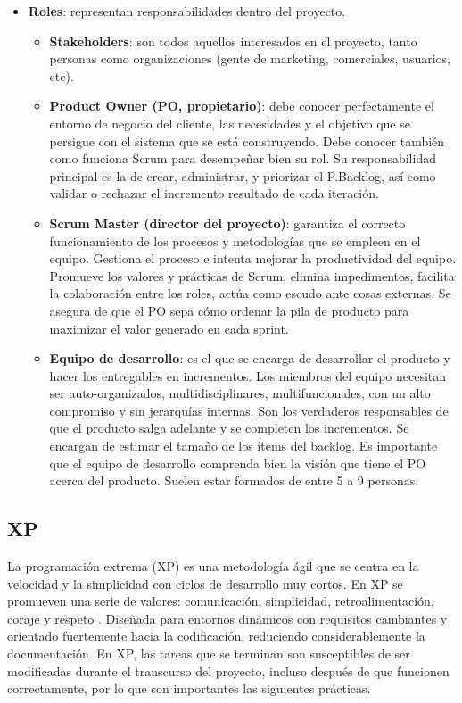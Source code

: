 \begin{itemize}
    \item \textbf{Roles}: representan responsabilidades dentro del proyecto.
    \begin{itemize}
        \item \textbf{Stakeholders}: son todos aquellos interesados en el proyecto, tanto personas como organizaciones (gente de marketing, comerciales, usuarios, etc).
        \item \textbf{Product Owner (PO, propietario)}: debe conocer perfectamente el entorno de negocio del cliente, las necesidades y el objetivo que se persigue con el sistema que se está construyendo. Debe conocer también como funciona Scrum para desempeñar bien su rol. Su responsabilidad principal es la de crear, administrar, y priorizar el P.Backlog, así como validar o rechazar el incremento resultado de cada iteración.
        \item \textbf{Scrum Master (director del proyecto)}: garantiza el correcto funcionamiento de los procesos y metodologías que se empleen en el equipo. Gestiona el proceso e intenta mejorar la productividad del equipo. Promueve los valores y prácticas de Scrum, elimina impedimentos, facilita la colaboración entre los roles, actúa como escudo ante cosas externas. Se asegura de que el PO sepa cómo ordenar la pila de producto para maximizar el valor generado en cada sprint.
        \item \textbf{Equipo de desarrollo}: es el que se encarga de desarrollar el producto y hacer los entregables en incrementos. Los miembros del equipo necesitan ser auto-organizados, multidisciplinares, multifuncionales, con un alto compromiso y sin jerarquías internas. Son los verdaderos responsables de que el producto salga adelante y se completen los incrementos. Se encargan de estimar el tamaño de los ítems del backlog. Es importante que el equipo de desarrollo comprenda bien la visión que tiene el PO acerca del producto. Suelen estar formados de entre 5 a 9 personas.
    \end{itemize}
\end{itemize}

\subsection{XP}
La programación extrema (XP) es una metodología ágil que se centra en la velocidad y la simplicidad con ciclos de desarrollo muy cortos. En XP se promueven una serie de valores: comunicación, simplicidad, retroalimentación, coraje y respeto \cite{salazar_scrum_2018}. Diseñada para entornos dinámicos con requisitos cambiantes y orientado fuertemente hacia la codificación, reduciendo considerablemente la documentación. En XP, las tareas que se terminan son susceptibles de ser modificadas durante el transcurso del proyecto, incluso después de que funcionen correctamente, por lo que son importantes las siguientes prácticas.

